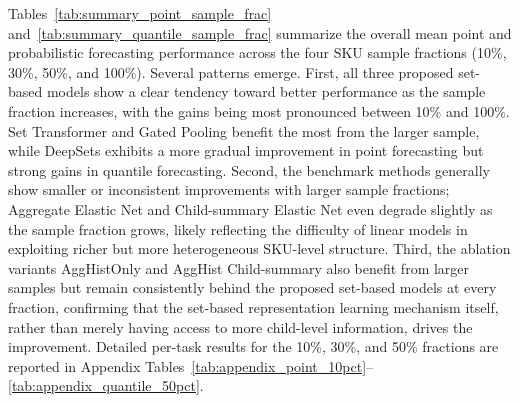 \documentclass[12pt]{article}
\begin{document}
Tables~\ref{tab:summary_point_sample_frac} and~\ref{tab:summary_quantile_sample_frac} summarize the overall mean point and probabilistic forecasting performance across the four SKU sample fractions (10\%, 30\%, 50\%, and 100\%). Several patterns emerge. First, all three proposed set-based models show a clear tendency toward better performance as the sample fraction increases, with the gains being most pronounced between 10\% and 100\%. Set Transformer and Gated Pooling benefit the most from the larger sample, while DeepSets exhibits a more gradual improvement in point forecasting but strong gains in quantile forecasting. Second, the benchmark methods generally show smaller or inconsistent improvements with larger sample fractions; Aggregate Elastic Net and Child-summary Elastic Net even degrade slightly as the sample fraction grows, likely reflecting the difficulty of linear models in exploiting richer but more heterogeneous SKU-level structure. Third, the ablation variants AggHistOnly and AggHist Child-summary also benefit from larger samples but remain consistently behind the proposed set-based models at every fraction, confirming that the set-based representation learning mechanism itself, rather than merely having access to more child-level information, drives the improvement. Detailed per-task results for the 10\%, 30\%, and 50\% fractions are reported in Appendix Tables~\ref{tab:appendix_point_10pct}--\ref{tab:appendix_quantile_50pct}.
\end{document}
